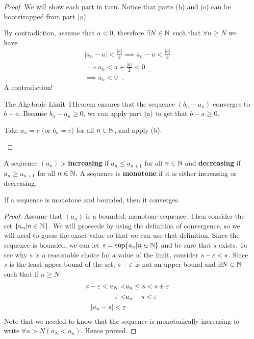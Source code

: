 \begin{proof}
	We will show each part in turn. Notice that parts (b) and (c) can be bootstrapped from part (a).
	\begin{alphabetize}
		\item By contradiction, assume that $a < 0 $, therefore $\exists N \in \mathbb{N}$ such that $\forall n \ge  N$ we have
	        	\begin{align}
       	        		\left|a_n - a\right| < \frac{\left|a\right|}{2} \implies a_n - a < \frac{\left|a\right|}{2} \\
                		\implies a_n < a + \frac{\left|a\right|}{2} < 0 \\
                		\implies a_n < 0 \text{ }.
        		\end{align}
        		A contradiction!
		\item The Algebraic Limit THeorem ensures that the sequence $\left( b_n - a_n \right) $ converges to $b - a$. Because $b_n - a_n \ge 0$, we can apply part (a) to get that $b - a \ge 0$.
		\item Take $a_n = c$ (or $b_n = c$) for all $n \in \mathbb{N}$, and apply (b).	
	\end{alphabetize}
\end{proof}

\begin{definition}
	A sequence $\left( a_n \right) $ is \textbf{increasing} if $a_n \le a_{n+1}$ for all $n \in \mathbb{N}$ and \textbf{decreasing} if $a_n \ge a_{n+1}$ for all $n \in \mathbb{N}$. A sequence is \textbf{monotone} if it is either increasing or decreasing.
\end{definition}

\begin{theorem}
	If a sequence is monotone and bounded, then it converges.
\end{theorem}

\begin{proof}
	Assume that $\left( a_n \right) $ is a bounded, monotone sequence. Then consider the set $\{a_n | n \in \mathbb{N}\} $. We will proceede by using the definition of convergence, so we will need to guess the exact value so that we can use that definition. Since the sequence is bounded, we can let $s = \sup \{a_n | n \in \mathbb{N}\} $ and be sure that $s$ exists. To see why $s$ is a reasonable choice for a value of the limit, consider $s - \e < s$. Since $s$ is the least upper bound of the set, $s - \e$ is not an upper bound and $\exists N \in \mathbb{N}$ such that if $n \ge N$
	\begin{align}
		s - \e < a_N < &a_n \le  s < s + \e \\
		-\e < &a_n - s < \e\\
		\left|a_n - s\right|< \e
	\end{align}
	Note that we needed to know that the sequence is monotonically increasing to write $\forall n > N \left( a_N < a_n \right) $. Hence proved.
\end{proof}

